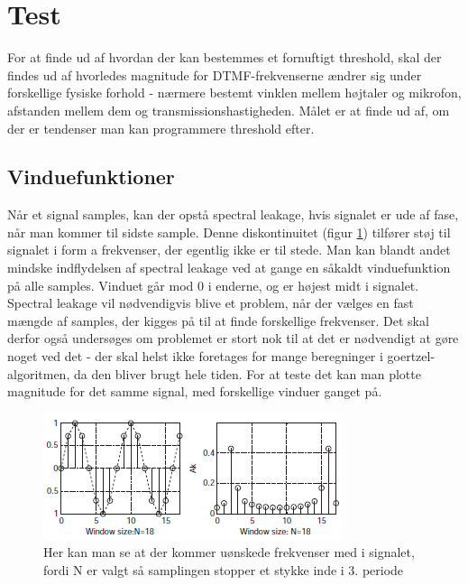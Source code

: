 \section{Test}

For at finde ud af hvordan der kan bestemmes et fornuftigt threshold, skal der findes ud af hvorledes magnitude for DTMF-frekvenserne ændrer sig under forskellige fysiske forhold - nærmere bestemt vinklen mellem højtaler og mikrofon, afstanden mellem dem og transmissionshastigheden. Målet er at finde ud af, om der er tendenser man kan programmere threshold efter. 

\subsection{Vinduefunktioner} \label{sec:Windowfunction}

Når et signal samples, kan der opstå spectral leakage, hvis signalet er ude af fase, når man kommer til sidste sample. Denne diskontinuitet (figur \ref{fig:Spectral}) tilfører støj til signalet i form a frekvenser, der egentlig ikke er til stede. Man kan blandt andet mindske indflydelsen af spectral leakage ved at gange en såkaldt vinduefunktion på alle samples. Vinduet går mod 0 i enderne, og er højest midt i signalet.\\
Spectral leakage vil nødvendigvis blive et problem, når der vælges en fast mængde af samples, der kigges på til at finde forskellige frekvenser. Det skal derfor også undersøges om problemet er stort nok til at det er nødvendigt at gøre noget ved det - der skal helst ikke foretages for mange beregninger i goertzel-algoritmen, da den bliver brugt hele tiden. For at teste det kan man plotte magnitude for det samme signal, med forskellige vinduer ganget på. 

\begin{figure}[h]
\centering
\includegraphics[scale=0.8]{Billeder/SpectralLeak.PNG}
\caption{Her kan man se at der kommer uønskede frekvenser med i signalet, fordi N er valgt så samplingen stopper et stykke inde i 3. periode}
\label{fig:Spectral}
\end{figure} 

